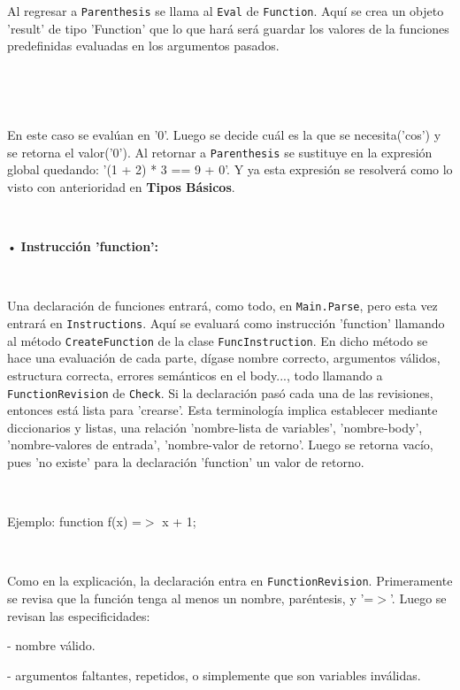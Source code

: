 \documentclass{article}
\begin{document}
\ 





\ 


Al regresar a {\texttt{Parenthesis}} se llama al {\texttt{Eval}} de {\texttt{Function}}. Aquí se crea un objeto 'result'
de tipo 'Function' que lo que hará será guardar los valores de la funciones predefinidas evaluadas en los argumentos pasados. 


\ 





\ 


En este caso se evalúan en '0'. Luego se decide cuál es la que se necesita('cos') y se retorna el valor('0'). Al retornar
a {\texttt{Parenthesis}} se sustituye en la expresión global quedando: '(1 + 2) * 3 == 9 + 0'. Y ya esta expresión se resolverá
como lo visto con anterioridad en  {\textbf{Tipos Básicos}}.


\


• \textbf{Instrucción 'function':}


\


Una declaración de funciones entrará, como todo, en {\texttt{Main.Parse}}, pero esta vez entrará en {\texttt{Instructions}}.
Aquí se evaluará como instrucción 'function' llamando al método {\texttt{CreateFunction}} de la clase 
{\texttt{FuncInstruction}}. En dicho método se hace una evaluación de cada parte, dígase nombre correcto,
argumentos válidos, estructura correcta, errores semánticos en el body..., todo llamando a {\texttt{FunctionRevision}} de
{\texttt{Check}}. Si la declaración pasó cada una de las revisiones, entonces está lista para 'crearse'. Esta terminología
implica establecer mediante diccionarios y listas, una relación 'nombre-lista de variables', 'nombre-body', 
'nombre-valores de entrada', 'nombre-valor de retorno'. Luego se retorna vacío, pues 'no existe' para la declaración
'function' un valor de retorno.


\


Ejemplo: function f(x) =$>$ x + 1;


\ 


Como en la explicación, la declaración entra en {\texttt{FunctionRevision}}. Primeramente se revisa que la función tenga
al menos un nombre, paréntesis, y '=$>$'. Luego se revisan las especificidades:


- nombre válido.


- argumentos faltantes, repetidos, o simplemente que son variables inválidas.
\end{document}
